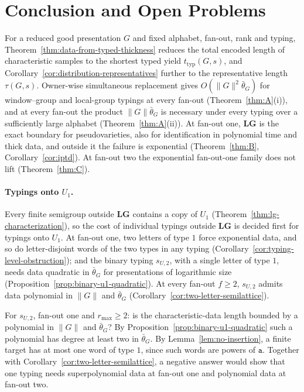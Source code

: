 \section{Conclusion and Open Problems}
\label{sec:conclusion}

For a reduced good presentation $G$ and fixed alphabet, fan-out, rank and typing,
Theorem~\ref{thm:data-from-typed-thickness} reduces the total encoded length of
characteristic samples to the shortest typed yield $t_{\mathrm{typ}}(G,s)$, and
Corollary~\ref{cor:distribution-representatives} further to the representative
length $\tau(G,s)$.  Owner-wise simultaneous replacement gives
$O(\|G\|^2\bar\theta_G)$ for window--group and local-group typings at every
fan-out (Theorem~\ref{thm:A}(i)), and at every fan-out the product
$\|G\|\bar\theta_G$ is necessary under every typing over a sufficiently large
alphabet (Theorem~\ref{thm:A}(ii)).  At
fan-out one, $\mathbf{LG}$ is the exact boundary for pseudovarieties, also for
identification in polynomial time and thick data, and outside it the failure is
exponential (Theorem~\ref{thm:B}, Corollary~\ref{cor:iptd}).  At fan-out two the
exponential fan-out-one family does not lift (Theorem~\ref{thm:C}).

\paragraph{Typings onto $U_1$.}
Every finite semigroup outside $\mathbf{LG}$ contains a copy of $U_1$
(Theorem~\ref{thm:lg-characterization}), so the cost of individual typings
outside $\mathbf{LG}$ is decided first for typings onto $U_1$.  At fan-out one,
two letters of type $1$ force exponential data, and so do letter-disjoint words
of the two types in any typing
(Corollary~\ref{cor:typing-level-obstruction}); and the binary typing $s_{U,2}$,
with a single letter of type $1$, needs data quadratic in $\bar\theta_G$ for
presentations of logarithmic size (Proposition~\ref{prop:binary-u1-quadratic}).
At every fan-out $f\ge2$, $s_{U,2}$ admits data polynomial in $\|G\|$ and
$\bar\theta_G$ (Corollary~\ref{cor:two-letter-semilattice}).

\begin{openproblem}
\label{op:S1}
For $s_{U,2}$, fan-out one and $r_{\max}\ge2$: is the characteristic-data length
bounded by a polynomial in $\|G\|$ and $\bar\theta_G$?  By
Proposition~\ref{prop:binary-u1-quadratic} such a polynomial has degree at least
two in $\bar\theta_G$.  By Lemma~\ref{lem:no-insertion}, a finite target has
at most one word of type $1$, since such words are powers of $\mathtt a$.  Together with Corollary~\ref{cor:two-letter-semilattice}, a
negative answer would show that one typing needs superpolynomial data at
fan-out one and polynomial data at fan-out two.
\end{openproblem}

